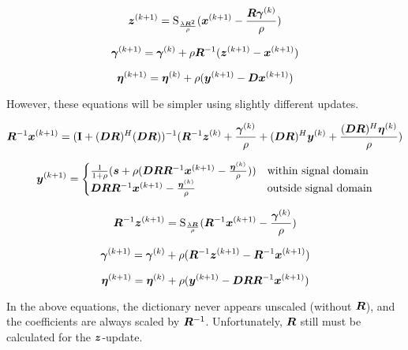 \documentclass{article}
\begin{document}
\begin{equation}
\bm{z}^{(k + 1)}= \operatorname{S}_{\frac{\lambda\bm{R}^2}{\rho}}(\bm{x}^{(k+1)} - \frac{\bm{R}\bm{\gamma}^{(k)}}{\rho})
\end{equation}

\begin{equation}
\bm{\gamma}^{(k + 1)} = \bm{\gamma}^{(k)} + \rho\bm{R}^{-1}(\bm{z}^{(k + 1)} - \bm{x}^{(k + 1)})
\end{equation}

\begin{equation}
\bm{\eta}^{(k + 1)} = \bm{\eta}^{(k)} + \rho(\bm{y}^{(k + 1)} - \bm{D}\bm{x}^{(k + 1)})
\end{equation}

However, these equations will be simpler using slightly different updates.

\begin{equation}
\bm{R}^{-1}\bm{x}^{(k + 1)} = ({\bf I} + (\bm{D}\bm{R})^H(\bm{D}\bm{R}))^{-1}(\bm{R}^{-1}\bm{z}^{(k)} + \frac{\bm{\gamma}^{(k)}}{\rho} + (\bm{D}\bm{R})^H\bm{y}^{(k)} + \frac{(\bm{D}\bm{R})^H\bm{\eta}^{(k)}}{\rho})
\end{equation}

\begin{equation}
\bm{y}^{(k + 1)}= \begin{cases}
\frac{1}{1 + \rho}(\bm{s} + \rho(\bm{D}\bm{R}\bm{R}^{-1}\bm{x}^{(k + 1)} - \frac{\bm{\eta}^{(k)}}{\rho})) & \text{within signal domain}\\
\bm{D}\bm{R}\bm{R}^{-1}\bm{x}^{(k + 1)} - \frac{\bm{\eta}^{(k)}}{\rho} & \text{outside signal domain}
\end{cases}
\end{equation}

\begin{equation}
\bm{R}^{-1}\bm{z}^{(k + 1)}= \operatorname{S}_{\frac{\lambda\bm{R}}{\rho}}(\bm{R}^{-1}\bm{x}^{(k+1)} - \frac{\bm{\gamma}^{(k)}}{\rho})
\end{equation}

\begin{equation}
\bm{\gamma}^{(k + 1)} = \bm{\gamma}^{(k)} + \rho(\bm{R}^{-1}\bm{z}^{(k + 1)} - \bm{R}^{-1}\bm{x}^{(k + 1)})
\end{equation}

\begin{equation}
\bm{\eta}^{(k + 1)} = \bm{\eta}^{(k)} + \rho(\bm{y}^{(k + 1)} - \bm{D}\bm{R}\bm{R}^{-1}\bm{x}^{(k + 1)})
\end{equation}


In the above equations, the dictionary never appears unscaled (without $\bm{R}$), and the coefficients are always scaled by $\bm{R}^{-1}$. Unfortunately,  $\bm{R}$ still must be calculated for the $\bm{z}$-update.
\end{document}
